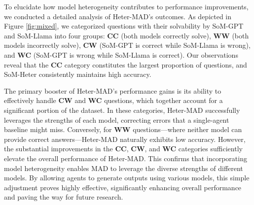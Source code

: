  To elucidate how model heterogeneity contributes to performance improvements, we conducted a detailed analysis of Heter-MAD’s outcomes. As depicted in Figure \ref{fig:mixed}, we categorized questions with their solvability by SoM-GPT and SoM-Llama into four groups: \textbf{CC} (both models correctly solve), \textbf{WW} (both models incorrectly solve), \textbf{CW} (SoM-GPT is correct while SoM-Llama is wrong), and \textbf{WC} (SoM-GPT is wrong while SoM-Llama is correct). Our observations reveal that the \textbf{CC} category constitutes the largest proportion of questions, and SoM-Heter consistently maintains high accuracy.

The primary booster of Heter-MAD's performance gains is its ability to effectively handle \textbf{CW} and \textbf{WC} questions, which together account for a significant portion of the dataset. In these categories, Heter-MAD successfully leverages the strengths of each model, correcting errors that a single-agent baseline might miss. Conversely, for \textbf{WW} questions---where neither model can provide correct answers---Heter-MAD naturally exhibits low accuracy. However, the substantial improvements in the \textbf{CC}, \textbf{CW}, and \textbf{WC} categories sufficiently elevate the overall performance of Heter-MAD. This confirms that incorporating model heterogeneity enables MAD to leverage the diverse strengths of different models. By allowing agents to generate outputs using various models, this simple adjustment proves highly effective, significantly enhancing overall performance and paving the way for future research.



